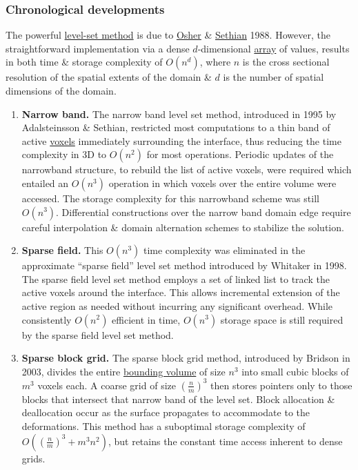 \documentclass{article}
\begin{document}
\subsubsection{Chronological developments}
The powerful \href{https://en.wikipedia.org/wiki/Level-set_method}{level-set method} is due to \href{https://en.wikipedia.org/wiki/Stanley_Osher}{\sc Osher} \& \href{https://en.wikipedia.org/wiki/James_Sethian}{\sc Sethian} 1988. However, the straightforward implementation via a dense $d$-dimensional \href{https://en.wikipedia.org/wiki/Array_data_structure}{array} of values, results in both time \& storage complexity of $O(n^d)$, where $n$ is the cross sectional resolution of the spatial extents of the domain \& $d$ is the number of spatial dimensions of the domain.
\begin{enumerate}
	\item {\bf Narrow band.} The narrow band level set method, introduced in 1995 by {\sc Adalsteinsson \& Sethian}, restricted most computations to a thin band of active \href{https://en.wikipedia.org/wiki/Voxel}{voxels} immediately surrounding the interface, thus reducing the time complexity in 3D to $O(n^2)$ for most operations. Periodic updates of the narrowband structure, to rebuild the list of active voxels, were required which entailed an $O(n^3)$ operation in which voxels over the entire volume were accessed. The storage complexity for this narrowband scheme was still $O(n^3)$. Differential constructions over the narrow band domain edge require careful interpolation \& domain alternation schemes to stabilize the solution.
	\item {\bf Sparse field.} This $O(n^3)$ time complexity was eliminated in the approximate ``sparse field'' level set method introduced by {\sc Whitaker} in 1998. The sparse field level set method employs a set of linked list to track the active voxels around the interface. This allows incremental extension of the active region as needed without incurring any significant overhead. While consistently $O(n^2)$ efficient in time, $O(n^3)$ storage space is still required by the sparse field level set method.
	\item {\bf Sparse block grid.} The sparse block grid method, introduced by {\sc Bridson} in 2003, divides the entire \href{https://en.wikipedia.org/wiki/Bounding_volume}{bounding volume} of size $n^3$ into small cubic blocks of $m^3$ voxels each. A coarse grid of size $\left(\frac{n}{m}\right)^3$ then stores pointers only to those blocks that intersect that narrow band of the level set. Block allocation \& deallocation occur as the surface propagates to accommodate to the deformations. This method has a suboptimal storage complexity of $O(\left(\frac{n}{m}\right)^3 + m^3n^2)$, but retains the constant time access inherent to dense grids.

\end{enumerate}
\end{document}
